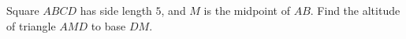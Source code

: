 Square $ABCD$ has side length $5$, and $M$ is the midpoint of $AB$. Find the altitude of triangle $AMD$ to base $DM$.
